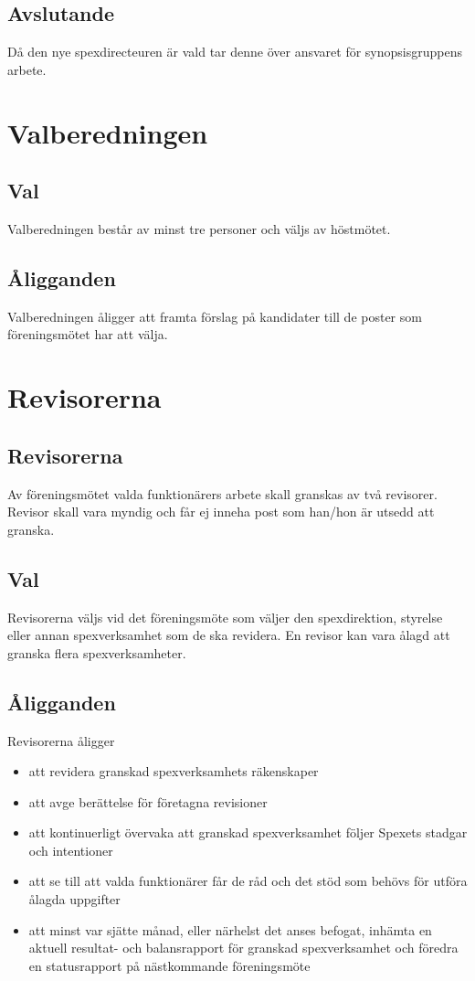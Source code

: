 \documentclass[a4paper]{article}
\begin{document}
\subsection{Avslutande}
Då den nye spexdirecteuren är vald tar denne över ansvaret för synopsisgruppens arbete.

\section{Valberedningen}
\label{section:valberedningen}

\subsection{Val}
Valberedningen består av minst tre personer och väljs av höstmötet.

\subsection{Åligganden}
Valberedningen åligger att framta förslag på kandidater till de poster som föreningsmötet har att välja.

\section{Revisorerna}
\label{section:revisorerna}

\subsection{Revisorerna}
Av föreningsmötet valda funktionärers arbete skall granskas av två revisorer. Revisor skall vara myndig och får ej inneha post som han/hon är utsedd att granska.

\subsection{Val}
Revisorerna väljs vid det föreningsmöte som väljer den spexdirektion, styrelse eller annan spexverksamhet som de ska revidera. En revisor kan vara ålagd att granska flera spexverksamheter.

\subsection{Åligganden}
Revisorerna åligger

\begin{itemize}
  \item att revidera granskad spexverksamhets räkenskaper
  \item att avge berättelse för företagna revisioner
  \item att kontinuerligt övervaka att granskad spexverksamhet följer Spexets stadgar och intentioner
  \item att se till att valda funktionärer får de råd och det stöd som behövs för utföra ålagda uppgifter
  \item att minst var sjätte månad, eller närhelst det anses befogat, inhämta en aktuell resultat- och balansrapport för granskad spexverksamhet och föredra en statusrapport på nästkommande föreningsmöte
\end{itemize}
\end{document}
